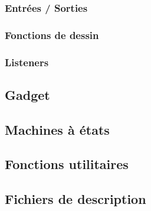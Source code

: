 \documentclass[a4paper]{article}
\begin{document}
\subsubsection{Entrées / Sorties}
\subsubsection{Fonctions de dessin}
\subsubsection{Listeners\label{listeners}}
\subsection{Gadget}
\subsection{Machines à états\label{statemachine}}
\subsection{Fonctions utilitaires}
\subsection{Fichiers de description}
\end{document}
